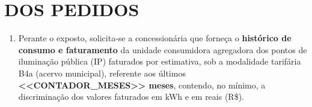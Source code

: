\section{DOS PEDIDOS}

\begin{enumerate}[resume]
\item 
Perante o exposto, solicita-se a concessionária que forneça o \textbf{histórico de consumo e faturamento} da unidade consumidora agregadora dos pontos de iluminação pública (IP) faturados por estimativa, sob a modalidade tarifária B4a (acervo municipal), referente aos últimos \textbf{<<CONTADOR_MESES>> meses}, contendo, no mínimo, a discriminação dos valores faturados em kWh e em reais (R\$).
\end{enumerate}
